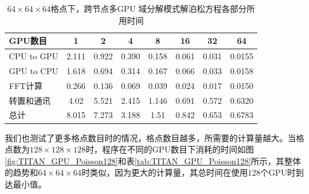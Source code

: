 \begin{table}
  \centering
  \begin{tabular}{|l|c|c|c|c|c|c|c|}
    \hline
    GPU数目	    &1	    &2	    &4	    &8 	    &16	    &32  	&64   \\
    \hline
    CPU to GPU	&2.111	&0.922	&0.390	&0.158	&0.061	&0.031	&0.0155 \\
    GPU to CPU	&1.618	&0.694	&0.314	&0.167	&0.066	&0.033	&0.0158 \\
    FFT计算  	    &0.266	&0.136	&0.069	&0.039	&0.024	&0.017	&0.0150 \\
    转置和通讯	&4.02	&5.521	&2.415	&1.146	&0.691	&0.572	&0.6320 \\
    总计	        &8.015	&7.273	&3.188	&1.51	&0.842	&0.653	&0.6783 \\
    \hline
  \end{tabular}
  \caption{$64 \times 64 \times 64$格点下，跨节点多GPU 域分解模式解泊松方程各部分所用时间}
  \label{tab:TITAN_GPU_Poisson64}
\end{table}

我们也测试了更多格点数目时的情况，格点数目越多，所需要的计算量越大。当格点数为$128 \times 128 \times 128$时，程序在不同的GPU数目下消耗的时间如图\ref{fig:TITAN_GPU_Poisson128}和表\ref{tab:TITAN_GPU_Poisson128}所示，其整体的趋势和$64 \times 64 \times 64$时类似，因为更大的计算量，其总时间在使用128个GPU时到达最小值。

